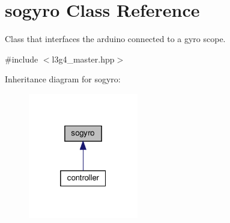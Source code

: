 \hypertarget{classsogyro}{}\section{sogyro Class Reference}
\label{classsogyro}


Class that interfaces the arduino connected to a gyro scope.  




{\ttfamily \#include $<$l3g4\+\_\+master.\+hpp$>$}



Inheritance diagram for sogyro\+:
\nopagebreak
\begin{figure}[H]
\begin{center}
\leavevmode
\includegraphics[width=136pt]{classsogyro__inherit__graph}
\end{center}
\end{figure}
